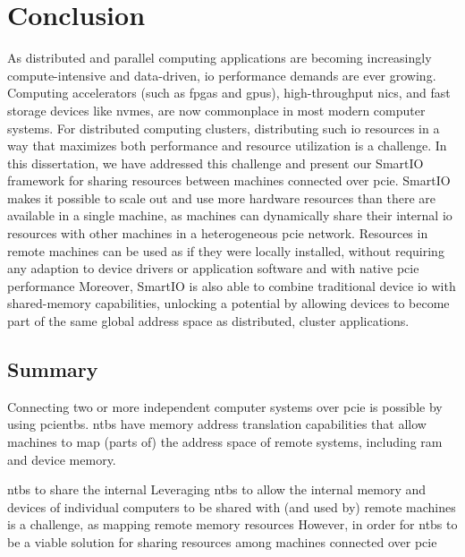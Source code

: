 \chapter{Conclusion}\label{chapter:conclusion}
As distributed and parallel computing applications are becoming increasingly compute-intensive and data-driven, \gls{io} performance demands are ever growing.
%
Computing accelerators (such as \glspl{fpga} and \glspl{gpu}), high-throughput \glspl{nic}, and fast storage devices like \glspl{nvme}, are now commonplace in most modern computer systems.
%
For distributed computing clusters, distributing such \gls{io} resources in a way that maximizes both performance and resource utilization is a challenge.
%
In this dissertation, we have addressed this challenge and present our SmartIO framework for sharing resources between machines connected over \gls{pcie}.
%
SmartIO makes it possible to scale out and use more hardware resources than there are available in a single machine, as  machines can dynamically share their internal \gls{io} resources with other machines in a heterogeneous \gls{pcie} network.
%
Resources in remote machines can be used as if they were locally installed, without requiring any adaption to device drivers or application software and with native \gls{pcie} performance
%
Moreover, SmartIO is also able to combine traditional device \gls{io} with shared-memory capabilities, unlocking a potential by allowing devices to become part of the same global address space as distributed, cluster applications.




\section{Summary}
Connecting two or more independent computer systems over \gls{pcie} is possible by using \glspl{pcientb}.
%
\Glspl{ntb} have memory address translation capabilities that allow machines to map (parts of) the address space of remote systems, including \gls{ram} and device memory.
%



\glspl{ntb} to share the internal
Leveraging \glspl{ntb} to allow the internal memory and devices of individual computers to be shared with (and used by) remote machines is a challenge, as mapping remote memory resources 
%
However, in order for \glspl{ntb} to be a viable solution for sharing resources among machines connected over \gls{pcie}


